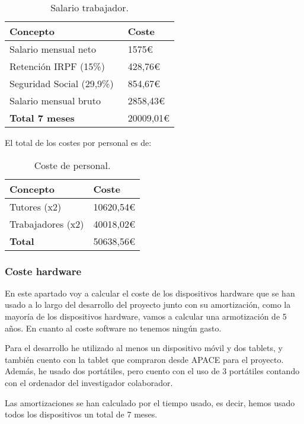 \begin{table}[H]
	\centering
	\begin{tabular}{ll}
		\toprule
		\textbf{Concepto}         & \textbf{Coste}                \\
		\midrule
		Salario mensual neto      & 1575\euro     \\
		Retención IRPF (15\%)     & 428,76\euro   \\
		Seguridad Social (29,9\%)~\cite{gobees} & 854,67\euro   \\
		Salario mensual bruto     & 2858,43\euro  \\
		\midrule
		\textbf{Total 7 meses}    & 20009,01\euro \\		
		\bottomrule
	\end{tabular}
	\caption{Salario trabajador.}
\end{table}

El total de los costes por personal es de:
\begin{table}[H]
	\centering
	\begin{tabular}{ll}
		\toprule
		\textbf{Concepto} & \textbf{Coste} \\ \midrule
		Tutores (x2)      & 10620,54\euro   \\
		Trabajadores (x2) & 40018,02\euro   \\ \midrule
		\textbf{Total}    & 50638,56\euro   \\ \bottomrule
	\end{tabular}
	\caption{Coste de personal.}
\end{table}

\subsubsection{Coste hardware}
En este apartado voy a calcular el coste de los dispositivos hardware que se han usado a lo largo del desarrollo del proyecto junto con su amortización, como la mayoría de los dispositivos hardware, vamos a calcular una armotización de 5 años. En cuanto al coste software no tenemos ningún gasto.

Para el desarrollo he utilizado al menos un dispositivo móvil y dos tablets, y también cuento con la tablet que compraron desde APACE para el proyecto. Además, he usado dos portátiles, pero cuento con el uso de 3 portátiles contando con el ordenador del investigador colaborador.

Las amortizaciones se han calculado por el tiempo usado, es decir, hemos usado todos los dispositivos un total de 7 meses.

